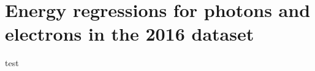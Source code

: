 \clearpage
\section{Energy regressions for photons and electrons in the 2016 dataset}
\label{app:regression}

test